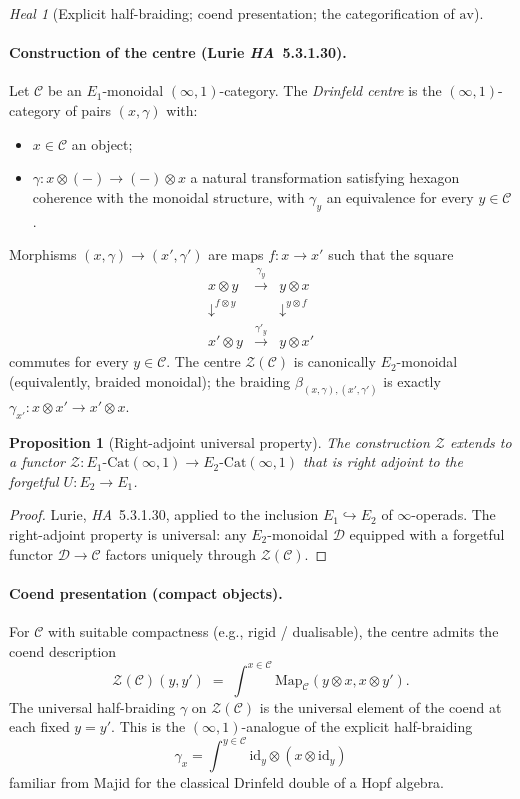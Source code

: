 \documentclass[11pt]{article}
\newtheorem{prop}[thm]{Proposition}
\theoremstyle{definition}
\theoremstyle{remark}
\newtheorem{heal}[thm]{Heal}
\newcommand{\cC}{\mathcal{C}}
\newcommand{\cD}{\mathcal{D}}
\newcommand{\cZ}{\mathcal{Z}}
\newcommand{\Map}{\mathrm{Map}}
\newcommand{\Eone}{E_1}
\newcommand{\Etwo}{E_2}
\newcommand{\id}{\mathrm{id}}
\newcommand{\av}{\mathrm{av}}
\begin{document}
\begin{heal}[Explicit half-braiding; coend presentation; the
categorification of $\av$]
\label{heal:drinfeld-av}
\paragraph{Construction of the centre (Lurie \emph{HA}~5.3.1.30).}
Let $\cC$ be an $\Eone$-monoidal $(\infty,1)$-category. The
\emph{Drinfeld centre} is the $(\infty,1)$-category of pairs
$(x, \gamma)$ with:
\begin{itemize}[leftmargin=*,itemsep=0pt]
\item $x \in \cC$ an object;
\item $\gamma\colon x \otimes (-) \to (-) \otimes x$ a natural
transformation satisfying hexagon coherence with the monoidal
structure, with $\gamma_y$ an equivalence for every $y \in \cC$.
\end{itemize}
Morphisms $(x, \gamma) \to (x', \gamma')$ are maps
$f\colon x \to x'$ such that the square
\[
\begin{array}{ccc}
x \otimes y & \xrightarrow{\gamma_y} & y \otimes x \\
\downarrow^{f \otimes y} & & \downarrow^{y \otimes f} \\
x' \otimes y & \xrightarrow{\gamma'_y} & y \otimes x'
\end{array}
\]
commutes for every $y \in \cC$. The centre $\cZ(\cC)$ is
canonically $\Etwo$-monoidal (equivalently, braided monoidal);
the braiding $\beta_{(x,\gamma),(x',\gamma')}$ is exactly
$\gamma_{x'}\colon x \otimes x' \to x' \otimes x$.

\begin{prop}[Right-adjoint universal property]
\label{prop:right-adjoint-centre}
The construction $\cZ$ extends to a functor
$\cZ\colon \Eone\text{-}\mathrm{Cat}(\infty,1) \to
\Etwo\text{-}\mathrm{Cat}(\infty,1)$
that is right adjoint to the forgetful $U\colon \Etwo \to \Eone$.
\end{prop}

\begin{proof}
Lurie, \emph{HA}~5.3.1.30, applied to the inclusion
$\Eone \hookrightarrow \Etwo$ of $\infty$-operads. The
right-adjoint property is universal: any $\Etwo$-monoidal
$\cD$ equipped with a forgetful functor $\cD \to \cC$ factors
uniquely through $\cZ(\cC)$.
\end{proof}

\paragraph{Coend presentation (compact objects).}
For $\cC$ with suitable compactness (e.g., rigid / dualisable),
the centre admits the coend description
\[
\cZ(\cC)(y, y')
\;=\;
\int^{x \in \cC} \Map_{\cC}(y \otimes x, x \otimes y').
\]
The universal half-braiding $\gamma$ on $\cZ(\cC)$ is the
universal element of the coend at each fixed $y = y'$. This is
the $(\infty,1)$-analogue of the explicit half-braiding
\[
\gamma_x = \int^{y \in \cC} \id_y \otimes (x \otimes \id_y)
\]
familiar from Majid \cite{Majid1991} for the classical Drinfeld
double of a Hopf algebra.


\end{heal}
\end{document}
